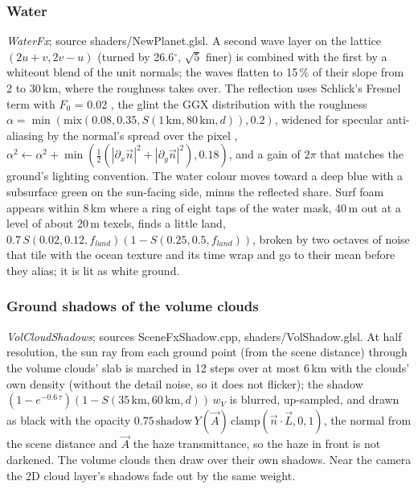 \documentclass[Orbiter Technical Reference.tex]{subfiles}
\begin{document}
\begin{sloppypar}
\subsubsection{Water}
\textit{WaterFx}; source shaders/NewPlanet.glsl. A second wave layer on the lattice $(2u + v, 2v - u)$ (turned by 26.6$^{\circ}$, $\sqrt{5}$ finer) is combined with the first by a whiteout blend of the unit normals; the waves flatten to 15\,\% of their slope from 2 to 30\,km, where the roughness takes over. The reflection uses Schlick's Fresnel term with $F_{0}$ = 0.02 \cite{schlick1994}, the glint the GGX distribution \cite{walter2007} with the roughness $\alpha = \min(\mathrm{mix}(0.08, 0.35, S(1\,\mathrm{km}, 80\,\mathrm{km}, d)), 0.2)$, widened for specular anti-aliasing by the normal's spread over the pixel \cite{kaplanyan2016}, $\alpha^{2} \leftarrow \alpha^{2} + \min(\frac{1}{2}(|\partial_{x}\vec{n}|^{2} + |\partial_{y}\vec{n}|^{2}), 0.18)$, and a gain of $2\pi$ that matches the ground's lighting convention. The water colour moves toward a deep blue with a subsurface green on the sun-facing side, minus the reflected share. Surf foam appears within 8\,km where a ring of eight taps of the water mask, 40\,m out at a level of about 20\,m texels, finds a little land, $0.7\,S(0.02, 0.12, f_{land})(1 - S(0.25, 0.5, f_{land}))$, broken by two octaves of noise that tile with the ocean texture and its time wrap and go to their mean before they alias; it is lit as white ground.

\subsubsection{Ground shadows of the volume clouds}
\textit{VolCloudShadows}; sources SceneFxShadow.cpp, shaders/VolShadow.glsl. At half resolution, the sun ray from each ground point (from the scene distance) through the volume clouds' slab is marched in 12 steps over at most 6\,km with the clouds' own density (without the detail noise, so it does not flicker); the shadow $(1 - e^{-0.6\,\tau})(1 - S(35\,\mathrm{km}, 60\,\mathrm{km}, d))\,w_{V}$ is blurred, up-sampled, and drawn as black with the opacity $0.75\,\mathrm{shadow}\,Y(\vec{A})\,\mathrm{clamp}(\vec{n}\cdot\vec{L}, 0, 1)$, the normal from the scene distance and $\vec{A}$ the haze transmittance, so the haze in front is not darkened. The volume clouds then draw over their own shadows. Near the camera the 2D cloud layer's shadows fade out by the same weight.


\end{sloppypar}
\end{document}

